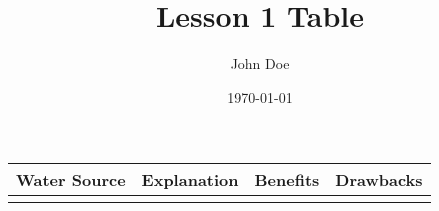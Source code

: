 \documentclass[11pt]{article}
\author{John Doe}
\date{\today}
\title{Lesson 1 Table}
\begin{document}
\maketitle
\tableofcontents

\begin{center}
\begin{tabular}{llll}
Water Source & Explanation & Benefits & Drawbacks\\
\hline
 &  &  & \\
\end{tabular}
\end{center}
\end{document}
